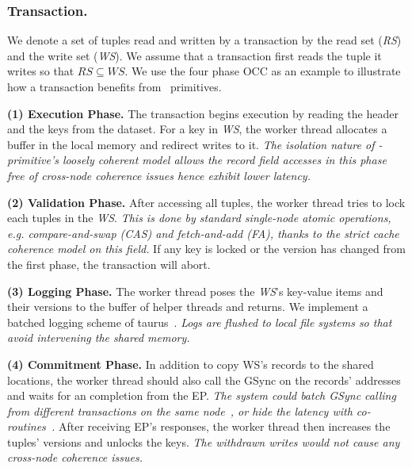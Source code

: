 


\ifx\undefined\stale
\subsubsection{Transaction. }
We denote a set of tuples read and written by a transaction by the read set (\textit{RS}) and the write set (\textit{WS}). We assume that a transaction first reads the tuple it writes so that $RS \subseteq WS$. We use the four phase OCC as an example to illustrate how a transaction benefits from \name~primitives. 

\noindent \textbf{(1) Execution Phase. }The transaction begins execution by reading the header and the keys from the dataset. For a key in \textit{WS}, the worker thread allocates a buffer in the local memory and redirect writes to it. \textit{The isolation nature of \name-primitive's loosely coherent model allows the \textit{record field} accesses in this phase free of cross-node coherence issues hence exhibit lower latency. }

\noindent \textbf{(2) Validation Phase. } After accessing all tuples, the worker thread tries to lock each tuples in the \textit{WS}. \textit{This is done by standard single-node atomic operations, e.g. compare-and-swap (CAS) and fetch-and-add (FA), thanks to the strict cache coherence model on this field. }
If any key is locked or the version has changed from the first phase, the transaction will abort.

\noindent \textbf{(3) Logging Phase. } The worker thread poses the \textit{WS}'s key-value items and their versions to the buffer of helper threads and returns. We implement a batched logging scheme of taurus~\cite{taurus_vldb2020}. \textit{Logs are flushed to local file systems so that avoid intervening the shared memory. }

\noindent \textbf{(4) Commitment Phase. } 
In addition to copy WS's records to the shared locations, the worker thread should also call the GSync on the records' addresses and waits for an completion from the EP. 
\textit{The system could batch GSync calling from different transactions on the same node~\cite{fasst}, or hide the latency with co-routines~\cite{drtmh}. } After receiving EP's responses, the worker thread then increases the tuples' versions and unlocks the keys. 
\textit{The withdrawn writes would not cause any cross-node coherence issues. }

